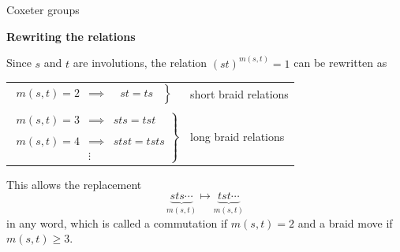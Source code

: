 \documentclass[10pt, compress,aspectratio=169,handout]{beamer}
\begin{document}
\begin{frame}{Coxeter groups}\pause

\vspace{1em}

\begin{block}{\textbf{Rewriting the relations}}

\vspace{-.5em}

Since $s$ and $t$ are involutions, the relation $(st)^{m(s,t)}=1$ can be rewritten as \pause

\vspace{-.5em}

\begin{center}
\begin{tabular}{ll}
$\left.\begin{array}{lcc}m(s,t)=2 & \implies &\ \ \, st=ts\ \
\end{array}\right\}$& \alert{short braid relations}\\ \\ \pause
$\left.\begin{array}{lcc}m(s,t)=3 & \implies & sts=tst \\ & & \\ m(s,t)=4 & \implies & stst=tsts \\ & \vdots & \end{array}\right\}$ &\alert{long braid relations}
\end{tabular}
\end{center}

\vspace{-.5em}

\pause

This allows the replacement
\[
\underbrace{sts \cdots}_{m(s,t)} \mapsto \underbrace{tst \cdots}_{m(s,t)}
\]
in any word, which is called a \alert{commutation} if $m(s,t) = 2$ and a \alert{braid move} if $m(s,t) \geq 3$.
\end{block}

\end{frame}

\end{document}
